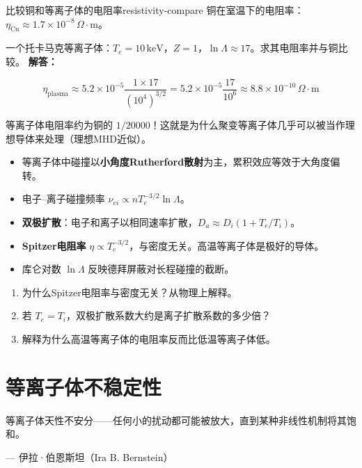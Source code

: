 \documentclass[12pt,a4paper,openany,oneside]{book}
\newcommand{\difficulty}[1]{\marginnote{\textcolor{red}{\textbf{[#1]}}}}
\begin{document}
\begin{example}{比较铜和等离子体的电阻率}{resistivity-compare}
\difficulty{提高}
铜在室温下的电阻率：$\eta_{\text{Cu}} \approx 1.7\times 10^{-8}\,\Omega\cdot\mathrm{m}$。

一个托卡马克等离子体：$T_e = 10\,\mathrm{keV}$，$Z=1$，$\ln\Lambda \approx 17$。求其电阻率并与铜比较。
\tcblower
\textbf{解答：}

\[
\eta_{\text{plasma}} \approx 5.2\times 10^{-5} \frac{1\times 17}{(10^4)^{3/2}} = 5.2\times 10^{-5} \frac{17}{10^6} \approx 8.8\times 10^{-10}\,\Omega\cdot\mathrm{m}
\]

等离子体电阻率约为铜的 $1/20000$！这就是为什么聚变等离子体几乎可以被当作理想导体来处理（理想MHD近似）。
\end{example}

\begin{chapterreview}
\begin{itemize}
\item 等离子体中碰撞以\textbf{小角度Rutherford散射}为主，累积效应等效于大角度偏转。
\item 电子--离子碰撞频率 $\nu_{ei} \propto n T_e^{-3/2} \ln\Lambda$。
\item \textbf{双极扩散}：电子和离子以相同速率扩散，$D_a \approx D_i(1+T_e/T_i)$。
\item \textbf{Spitzer电阻率} $\eta \propto T_e^{-3/2}$，与密度无关。高温等离子体是极好的导体。
\item 库仑对数 $\ln\Lambda$ 反映德拜屏蔽对长程碰撞的截断。
\end{itemize}
\end{chapterreview}

\begin{miniquiz}
\begin{enumerate}
\item 为什么Spitzer电阻率与密度无关？从物理上解释。
\item 若 $T_e = T_i$，双极扩散系数大约是离子扩散系数的多少倍？
\item 解释为什么高温等离子体的电阻率反而比低温等离子体低。
\end{enumerate}
\end{miniquiz}


\chapter{等离子体不稳定性}
\epigraph{等离子体天性不安分——任何小的扰动都可能被放大，直到某种非线性机制将其饱和。}{--- 伊拉·伯恩斯坦（Ira B. Bernstein）}
\end{document}
